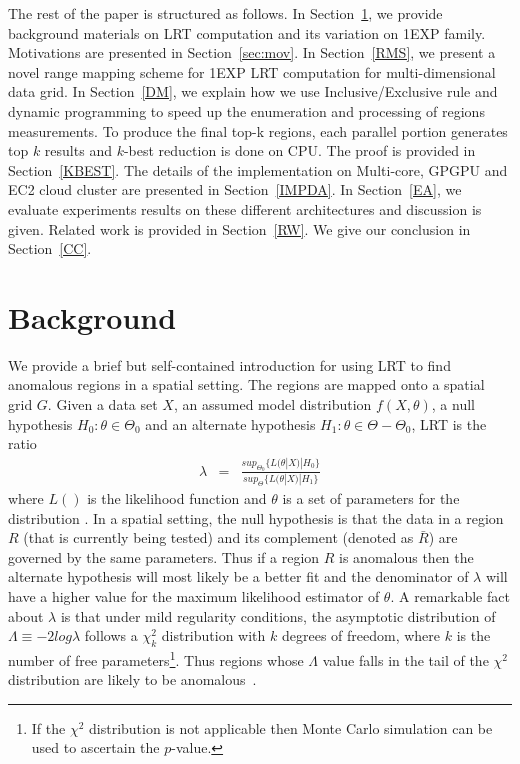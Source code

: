 \documentclass[AMA,LATO1COL]{WileyNJD-v2}
\begin{document}
The rest of the paper is structured as follows. In Section~\ref{BG}, we provide
background materials on LRT computation and its variation on 1EXP family. Motivations are presented in Section~\ref{sec:mov}.  In Section~\ref{RMS}, we present a novel range mapping scheme for 1EXP LRT computation for multi-dimensional data grid. In Section~\ref{DM}, we explain how we use
Inclusive/Exclusive rule and dynamic programming to speed up the enumeration and
processing of regions measurements. To produce the final top-k regions, each parallel portion generates top $k$ results and $k$-best reduction is done on CPU. The proof is provided in Section~\ref{KBEST}. The details of the implementation on Multi-core, GPGPU and EC2 cloud cluster are presented in
Section~\ref{IMPDA}. In Section~\ref{EA}, we evaluate experiments results on these different architectures and discussion is given. Related
work is provided in Section~\ref{RW}. We give our conclusion in
Section~\ref{CC}.

\section{Background}\label{BG}

We provide a brief but self-contained introduction for using LRT
to find anomalous regions in a spatial setting. The regions are mapped onto a spatial grid $G$. Given a data set $X$, an assumed model distribution $f(X,\theta)$, a null hypothesis $H_{0}: \theta \in \Theta_0 $ and an alternate hypothesis $H_{1}: \theta \in {\Theta-\Theta_0}$, LRT is the ratio
\begin{eqnarray}\label{eq}
\lambda &=& \frac{ sup_{\Theta_0}\{L(\theta|X)|H_{0}\}}
{sup_{\Theta}\{L(\theta|X)|H_{1}\}}
\end{eqnarray}
where $L()$ is the likelihood function and  $\theta$ is a set of parameters
for the distribution \cite{jour}. In a spatial setting, the null hypothesis is that the data in a region $R$ (that is currently being tested) and
its complement (denoted as $\bar R$) are governed by the same
parameters. Thus if a region $R$ is anomalous then the alternate hypothesis will most likely be a better fit and the denominator of $\lambda$ will have a higher value for the maximum likelihood estimator of $\theta$.  A remarkable fact about $\lambda$ is that under mild regularity conditions, the asymptotic distribution of $\Lambda \equiv -2log\lambda$ follows a $ \chi ^{2}_{k}$ distribution with $k$ degrees of freedom, where
$k$ is the number of free parameters\footnote{If the $\chi^{2}$ distribution is not applicable then Monte Carlo simulation can be used to ascertain the $p$-value.}. Thus regions whose $\Lambda$ value falls in the tail of the $\chi^{2}$ distribution are likely to be anomalous~\cite{jour}.
\end{document}
